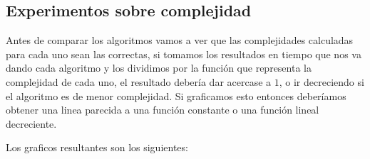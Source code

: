 \documentclass[a4paper]{article}
\begin{document}
%

\subsection{Experimentos sobre complejidad}
Antes de comparar los algoritmos vamos a ver que las complejidades calculadas para cada uno sean las correctas, si tomamos los resultados en tiempo que nos va dando cada algoritmo y los dividimos por la función que representa la complejidad de cada uno, el resultado debería dar acercase a $1$, o ir decreciendo si el algoritmo es de menor complejidad. Si graficamos esto entonces deberíamos obtener una linea parecida a una función constante o una función lineal decreciente.

Los graficos resultantes son los siguientes:
\end{document}
